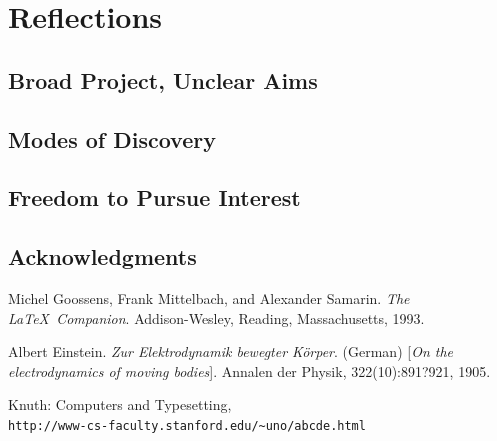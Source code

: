 \documentclass[11pt,a4paper]{report}
\begin{document}
\chapter{Reflections}
\section{Broad Project, Unclear Aims}
\section{Modes of Discovery}
\section{Freedom to Pursue Interest}
\section{Acknowledgments}





\begin{thebibliography}{9}
Michel Goossens, Frank Mittelbach, and Alexander Samarin. 
\textit{The \LaTeX\ Companion}. 
Addison-Wesley, Reading, Massachusetts, 1993.
 
Albert Einstein. 
\textit{Zur Elektrodynamik bewegter K{\"o}rper}. (German) 
[\textit{On the electrodynamics of moving bodies}]. 
Annalen der Physik, 322(10):891?921, 1905.
 
Knuth: Computers and Typesetting,
\\\texttt{http://www-cs-faculty.stanford.edu/\~{}uno/abcde.html}
\end{thebibliography}
 
\end{document}
